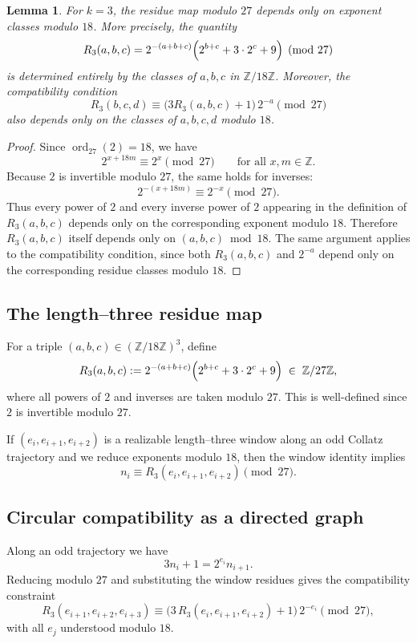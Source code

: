 \documentclass[11pt]{article}
\theoremstyle{definition}
\theoremstyle{plain}
\newtheorem{lemma}[theorem]{Lemma}
\theoremstyle{remark}
\begin{document}
\begin{lemma}\label{lem:mod18_reduction}
For $k=3$, the residue map modulo $27$ depends only on exponent classes modulo $18$.
More precisely, the quantity
\[
R_3(a,b,c)
=
2^{-(a+b+c)}
\Bigl(2^{b+c}+3\cdot 2^{c}+9\Bigr)
\pmod{27}
\]
is determined entirely by the classes of $a,b,c$ in $\mathbb{Z}/18\mathbb{Z}$.
Moreover, the compatibility condition
\[
R_3(b,c,d)\equiv \bigl(3R_3(a,b,c)+1\bigr)\,2^{-a}\pmod{27}
\]
also depends only on the classes of $a,b,c,d$ modulo $18$.
\end{lemma}

\begin{proof}
Since $\operatorname{ord}_{27}(2)=18$, we have
\[
2^{x+18m}\equiv 2^x \pmod{27}
\qquad\text{for all }x,m\in\mathbb{Z}.
\]
Because $2$ is invertible modulo $27$, the same holds for inverses:
\[
2^{-(x+18m)}\equiv 2^{-x}\pmod{27}.
\]
Thus every power of $2$ and every inverse power of $2$ appearing in the definition
of $R_3(a,b,c)$ depends only on the corresponding exponent modulo $18$.
Therefore $R_3(a,b,c)$ itself depends only on $(a,b,c)\bmod 18$.
The same argument applies to the compatibility condition, since both
$R_3(a,b,c)$ and $2^{-a}$ depend only on the corresponding residue classes
modulo $18$.
\end{proof}

\subsection{The length--three residue map}

For a triple $(a,b,c)\in(\mathbb{Z}/18\mathbb{Z})^3$, define
\begin{equation}\label{eq:R3def}
R_3(a,b,c)
:=
2^{-(a+b+c)}
\Bigl(2^{b+c}+3\cdot 2^{c}+9\Bigr)
\;\in\;\mathbb{Z}/27\mathbb{Z},
\end{equation}
where all powers of $2$ and inverses are taken modulo $27$.
This is well-defined since $2$ is invertible modulo $27$.

If $(e_i,e_{i+1},e_{i+2})$ is a realizable length--three window along an odd
Collatz trajectory and we reduce exponents modulo $18$, then the window identity
implies
\[
n_i \equiv R_3(e_i,e_{i+1},e_{i+2}) \pmod{27}.
\]

\subsection{Circular compatibility as a directed graph}

Along an odd trajectory we have
\[
3n_i+1 = 2^{e_i}n_{i+1}.
\]
Reducing modulo $27$ and substituting the window residues gives the compatibility
constraint
\begin{equation}\label{eq:compat3}
R_3(e_{i+1},e_{i+2},e_{i+3})
\equiv
\bigl(3\,R_3(e_i,e_{i+1},e_{i+2})+1\bigr)\,2^{-e_i}
\pmod{27},
\end{equation}
with all $e_j$ understood modulo $18$.
\end{document}
